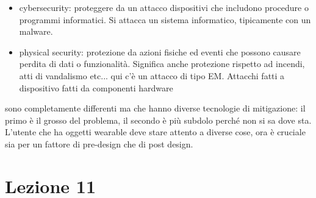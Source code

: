 \documentclass[oneside, 12pt]{extbook}
\begin{document}
\begin{itemize}
	\item cybersecurity: proteggere da un attacco dispositivi che includono procedure o programmi informatici. Si attacca un sistema informatico, tipicamente con un malware.
	\item physical security: protezione da azioni fisiche ed eventi che possono causare perdita di dati o funzionalità. Significa anche protezione rispetto ad incendi, atti di vandalismo etc... qui c'è un attacco di tipo EM. Attacchi fatti a dispositivo fatti da componenti hardware
\end{itemize}
sono completamente differenti ma che hanno diverse tecnologie di mitigazione: il primo è il grosso del problema, il secondo è più subdolo perché non si sa dove sta.\\L'utente che ha oggetti wearable deve stare attento  a diverse cose, ora è cruciale sia per un fattore di pre-design che di post design.

\chapter{Lezione 11}
\end{document}
